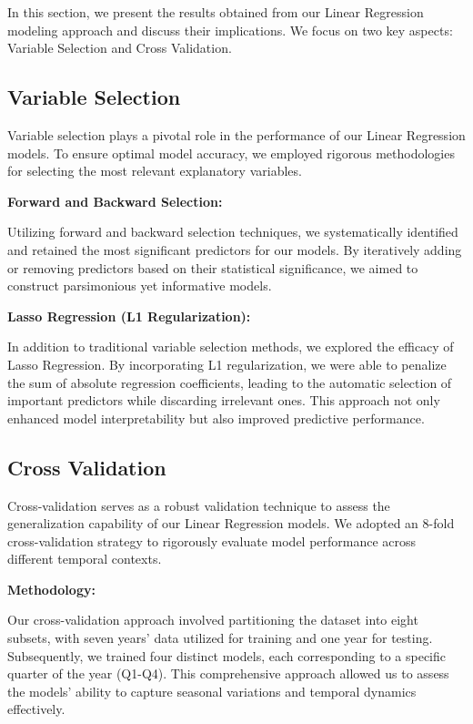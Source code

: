 \documentclass[12pt]{article}
\begin{document}
In this section, we present the results obtained from our Linear Regression modeling approach and discuss their implications. We focus on two key aspects: Variable Selection and Cross Validation.

\subsection{Variable Selection}

Variable selection plays a pivotal role in the performance of our Linear Regression models. To ensure optimal model accuracy, we employed rigorous methodologies for selecting the most relevant explanatory variables.

\textbf{Forward and Backward Selection:}

Utilizing forward and backward selection techniques, we systematically identified and retained the most significant predictors for our models. By iteratively adding or removing predictors based on their statistical significance, we aimed to construct parsimonious yet informative models.

\textbf{Lasso Regression (L1 Regularization):}

In addition to traditional variable selection methods, we explored the efficacy of Lasso Regression. By incorporating L1 regularization, we were able to penalize the sum of absolute regression coefficients, leading to the automatic selection of important predictors while discarding irrelevant ones. This approach not only enhanced model interpretability but also improved predictive performance.

\subsection{Cross Validation}

Cross-validation serves as a robust validation technique to assess the generalization capability of our Linear Regression models. We adopted an 8-fold cross-validation strategy to rigorously evaluate model performance across different temporal contexts.

\textbf{Methodology:}

Our cross-validation approach involved partitioning the dataset into eight subsets, with seven years' data utilized for training and one year for testing. Subsequently, we trained four distinct models, each corresponding to a specific quarter of the year (Q1-Q4). This comprehensive approach allowed us to assess the models' ability to capture seasonal variations and temporal dynamics effectively.
\end{document}
